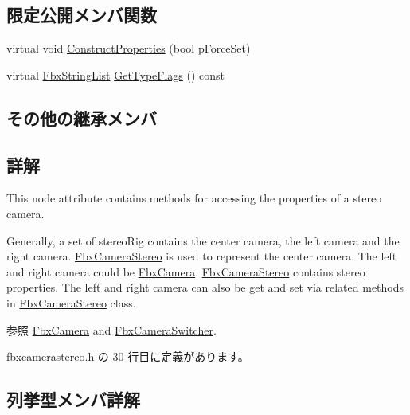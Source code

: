 \subsection*{限定公開メンバ関数}
\begin{DoxyCompactItemize}
\item 
virtual void \hyperlink{class_fbx_camera_stereo_a83a9b1ee59d0014b30411fe4877b5dec}{Construct\+Properties} (bool p\+Force\+Set)
\item 
virtual \hyperlink{class_fbx_string_list}{Fbx\+String\+List} \hyperlink{class_fbx_camera_stereo_a73c9df71edcd9a56b2710357b95fcde6}{Get\+Type\+Flags} () const
\end{DoxyCompactItemize}
\subsection*{その他の継承メンバ}


\subsection{詳解}
This node attribute contains methods for accessing the properties of a stereo camera.

Generally, a set of stereo\+Rig contains the center camera, the left camera and the right camera. \hyperlink{class_fbx_camera_stereo}{Fbx\+Camera\+Stereo} is used to represent the center camera. The left and right camera could be \hyperlink{class_fbx_camera}{Fbx\+Camera}. \hyperlink{class_fbx_camera_stereo}{Fbx\+Camera\+Stereo} contains stereo properties. The left and right camera can also be get and set via related methods in \hyperlink{class_fbx_camera_stereo}{Fbx\+Camera\+Stereo} class. \begin{DoxySeeAlso}{参照}
\hyperlink{class_fbx_camera}{Fbx\+Camera} and \hyperlink{class_fbx_camera_switcher}{Fbx\+Camera\+Switcher}. 
\end{DoxySeeAlso}


 fbxcamerastereo.\+h の 30 行目に定義があります。



\subsection{列挙型メンバ詳解}
\mbox{\label{class_fbx_camera_stereo_acb0f27675a73de0858983b703196cb37}} 
